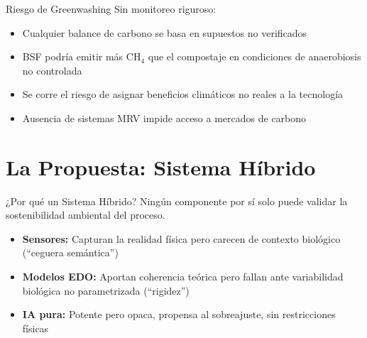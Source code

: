 \documentclass[aspectratio=169, 11pt]{beamer}
\begin{document}
\begin{frame}{Riesgo de Greenwashing}
    Sin monitoreo riguroso:
    \vspace{0.3cm}
    \begin{itemize}
        \item Cualquier balance de carbono se basa en supuestos no verificados
        \item BSF podría emitir más CH$_4$ que el compostaje en condiciones de anaerobiosis no controlada
        \item Se corre el riesgo de asignar beneficios climáticos no reales a la tecnología
        \item Ausencia de sistemas MRV impide acceso a mercados de carbono
    \end{itemize}
\end{frame}

\section{La Propuesta: Sistema Híbrido}

\begin{frame}{¿Por qué un Sistema Híbrido?}
    Ningún componente por sí solo puede validar la sostenibilidad ambiental del proceso.
    \vspace{0.3cm}
    \begin{itemize}
        \item \textbf{Sensores:} Capturan la realidad física pero carecen de contexto biológico (``ceguera semántica'')
        \item \textbf{Modelos EDO:} Aportan coherencia teórica pero fallan ante variabilidad biológica no parametrizada (``rigidez'')
        \item \textbf{IA pura:} Potente pero opaca, propensa al sobreajuste, sin restricciones físicas
    \end{itemize}
\end{frame}
\end{document}
